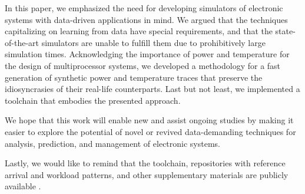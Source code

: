 In this paper, we emphasized the need for developing simulators of electronic
systems with data-driven applications in mind. We argued that the techniques
capitalizing on learning from data have special requirements, and that the
state-of-the-art simulators are unable to fulfill them due to prohibitively
large simulation times. Acknowledging the importance of power and temperature
for the design of multiprocessor systems, we developed a methodology for a fast
generation of synthetic power and temperature traces that preserve the
idiosyncrasies of their real-life counterparts. Last but not least, we
implemented a toolchain that embodies the presented approach.

We hope that this work will enable new and assist ongoing studies by making it
easier to explore the potential of novel or revived data-demanding techniques
for analysis, prediction, and management of electronic systems.

Lastly, we would like to remind that the toolchain, repositories with reference
arrival and workload patterns, and other supplementary materials are publicly
available \cite{sources}.
